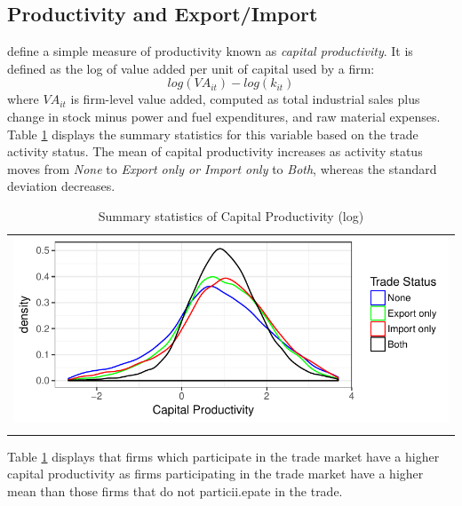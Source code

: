 \documentclass[12pt]{article}
\begin{document}
\subsection{Productivity and Export/Import}

\textcite{gupta2018exporting} define a simple measure of productivity known
as \textit{capital productivity}. It is defined as the log of value added per
unit of capital used by a firm:
\begin{equation}
 log(VA_{it}) - log(k_{it})
\end{equation}
where $VA_{it}$ is firm-level value added, computed as total industrial sales plus
change in stock minus power and fuel expenditures, and raw material
expenses. 
 Table \ref{tab:capprod} displays the summary statistics for this variable
based on the trade activity status. The mean of capital
productivity increases as activity status moves from \textit{None} to
\textit{Export only or Import only} to \textit{Both}, whereas the
standard deviation decreases.  
\begin{center}
\begin{table}[H]
\caption{Summary statistics of Capital Productivity (log)}
\label{tab:capprod}
\begin{tabular}{c}
 \includegraphics{./PICS/denscapprod.pdf}   \\ 
   \\  
\end{tabular}
\end{table}
\end{center}

  Table \ref{tab:capprod} displays that firms which participate in
the trade market  have a higher  capital productivity as firms
participating in the trade market have a higher mean than those firms
that do not particii.epate in the trade. 
\end{document}
